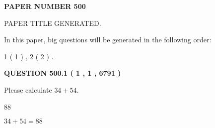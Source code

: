 \documentclass[12pt]{article}
\begin{document}
   
   
   
\newpage 
\setcounter{page}{ 
   500001 } 
   
   
   
   
 {\textbf{ \Large{ PAPER NUMBER  500  }}}
   
   
\vspace{0.2in}
   
   
   
   
   
   
   
   
 \vspace{0.2in}
 
 
 
 
   
   
 PAPER TITLE GENERATED.
   
   
   
\vspace{0.2in}
   
In this paper, big questions will be generated in the following order: 
   
   
   1 ( 1 )
 ,
   2 ( 2 )
 .
  
\vspace{0.2in}
  
{\textbf{\Large{QUESTION
500.1 
 ( 1 , 1 , 6791 )
}}}
  
  
 
Please calculate $ %
34 +  %
54 $.
 
 
 
\noindent{}
 
 

88
 
 
\noindent{}
 
 

 
 
 
\noindent{}
 
 

$ %
34 +  %
54=   %
88$
 
 
\noindent{}
 
 

 
   
   
   
\end{document}
